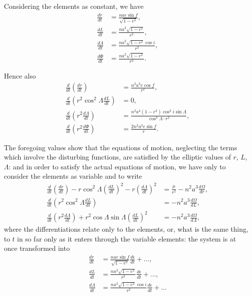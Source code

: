 \documentclass[11pt,a4paper]{book}
\begin{document}
Considering the elements as constant, we have
\begin{align*}
\frac{dr}{dt} &= \frac{nae\sin f}{\sqrt{1-e^2}}, \\
\frac{dL}{dt} &= \frac{na^2\sqrt{1-e^2}}{r^2}, \\
\frac{d\Lambda}{dt} &= \frac{na^2\sqrt{1-e^2}\cos i}{r^2}, \\
\frac{d\Phi}{dt} &= \frac{na^2\sqrt{1-e^2}}{r^2}.
\end{align*}

Hence also
\begin{align*}
\frac{d}{dt}\left(\frac{dr}{dt}\right) &= \frac{n^2a^3e\cos f}{r^2}, \\
\frac{d}{dt}\left(r^2\cos^2\Lambda\frac{dL}{dt}\right) &= 0, \\
\frac{d}{dt}\left(r^2\frac{d\Lambda}{dt}\right) &= \frac{n^2a^4(1-e^2)\cos^2 i\sin\Lambda}{\cos^3\Lambda \cdot r^2}, \\
\frac{d}{dt}\left(r^2\frac{d\Phi}{dt}\right) &= \frac{2n^2a^3e\sin f}{r}.
\end{align*}

The foregoing values show that the equations of motion, neglecting the terms which involve the disturbing functions, are satisfied by the elliptic values of $r$, $L$, $\Lambda$: and in order to satisfy the actual equations of motion, we have only to consider the elements as variable and to write
\begin{align*}
\frac{d}{dt}\left(\frac{dr}{dt}\right) - r\cos^2\Lambda\left(\frac{dL}{dt}\right)^2 - r\left(\frac{d\Lambda}{dt}\right)^2 &= \frac{\mu}{r^2} - n^2a^3\frac{d\Omega}{dr}, \\
\frac{d}{dt}\left(r^2\cos^2\Lambda\frac{dL}{dt}\right) &= -n^2a^3\frac{d\Omega}{dL}, \\
\frac{d}{dt}\left(r^2\frac{d\Lambda}{dt}\right) + r^2\cos\Lambda\sin\Lambda\left(\frac{dL}{dt}\right)^2 &= -n^2a^3\frac{d\Omega}{d\Lambda},
\end{align*}
where the differentiations relate only to the elements, or, what is the same thing, to $t$ in so far only as it enters through the variable elements: the system is at once transformed into
\begin{align*}
\frac{dr}{dt} &= \frac{nae\sin f}{\sqrt{1-e^2}}\frac{d\epsilon}{dt} + \ldots, \\
\frac{dL}{dt} &= \frac{na^2\sqrt{1-e^2}}{r^2}\frac{d\epsilon}{dt} + \ldots, \\
\frac{d\Lambda}{dt} &= \frac{na^2\sqrt{1-e^2}\cos i}{r^2}\frac{d\epsilon}{dt} + \ldots
\end{align*}
\end{document}
